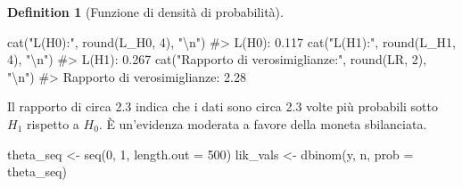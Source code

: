 \documentclass[
  letterpaper,
  DIV=11,
  numbers=noendperiod,
  oneside]{scrreprt}
\newenvironment{Shaded}{\begin{snugshade}}{\end{snugshade}}
\newcommand{\AttributeTok}[1]{\textcolor[rgb]{0.40,0.45,0.13}{#1}}
\newcommand{\CommentTok}[1]{\textcolor[rgb]{0.37,0.37,0.37}{#1}}
\newcommand{\DecValTok}[1]{\textcolor[rgb]{0.68,0.00,0.00}{#1}}
\newcommand{\FunctionTok}[1]{\textcolor[rgb]{0.28,0.35,0.67}{#1}}
\newcommand{\NormalTok}[1]{\textcolor[rgb]{0.00,0.23,0.31}{#1}}
\newcommand{\OtherTok}[1]{\textcolor[rgb]{0.00,0.23,0.31}{#1}}
\newcommand{\SpecialCharTok}[1]{\textcolor[rgb]{0.37,0.37,0.37}{#1}}
\newcommand{\StringTok}[1]{\textcolor[rgb]{0.13,0.47,0.30}{#1}}
\theoremstyle{definition}
\theoremstyle{plain}
\theoremstyle{definition}
\newtheorem{definition}{Definition}[chapter]
\theoremstyle{remark}
\begin{document}
\begin{definition}[Funzione di densità di
probabilità]
\begin{Shaded}
\begin{Highlighting}[]
\FunctionTok{cat}\NormalTok{(}\StringTok{"L(H0):"}\NormalTok{, }\FunctionTok{round}\NormalTok{(L\_H0, }\DecValTok{4}\NormalTok{), }\StringTok{"}\SpecialCharTok{\textbackslash{}n}\StringTok{"}\NormalTok{)}
\CommentTok{\#\textgreater{} L(H0): 0.117}
\FunctionTok{cat}\NormalTok{(}\StringTok{"L(H1):"}\NormalTok{, }\FunctionTok{round}\NormalTok{(L\_H1, }\DecValTok{4}\NormalTok{), }\StringTok{"}\SpecialCharTok{\textbackslash{}n}\StringTok{"}\NormalTok{)}
\CommentTok{\#\textgreater{} L(H1): 0.267}
\FunctionTok{cat}\NormalTok{(}\StringTok{"Rapporto di verosimiglianze:"}\NormalTok{, }\FunctionTok{round}\NormalTok{(LR, }\DecValTok{2}\NormalTok{), }\StringTok{"}\SpecialCharTok{\textbackslash{}n}\StringTok{"}\NormalTok{)}
\CommentTok{\#\textgreater{} Rapporto di verosimiglianze: 2.28}
\end{Highlighting}
\end{Shaded}

Il rapporto di circa 2.3 indica che i dati sono circa 2.3 volte più
probabili sotto \(H_1\) rispetto a \(H_0\). È un'evidenza moderata a
favore della moneta sbilanciata.

\begin{Shaded}
\begin{Highlighting}[]
\NormalTok{theta\_seq }\OtherTok{\textless{}{-}} \FunctionTok{seq}\NormalTok{(}\DecValTok{0}\NormalTok{, }\DecValTok{1}\NormalTok{, }\AttributeTok{length.out =} \DecValTok{500}\NormalTok{)}
\NormalTok{lik\_vals }\OtherTok{\textless{}{-}} \FunctionTok{dbinom}\NormalTok{(y, n, }\AttributeTok{prob =}\NormalTok{ theta\_seq)}


\end{Highlighting}
\end{Shaded}
\end{definition}
\end{document}
